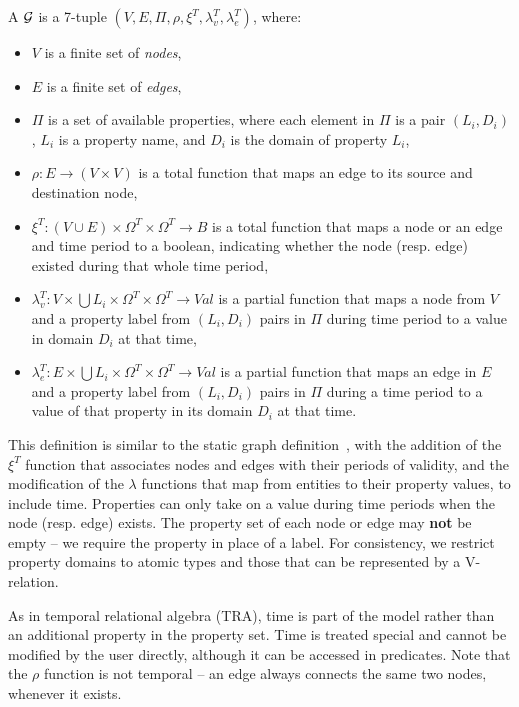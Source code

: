 \begin{definition}[TGraph]
\label{def:tg1}
A \tg $\mathcal{G}$ is a 7-tuple \break $(V,E,\Pi,\rho,\xi^T,\lambda^T_v,\lambda^T_e)$, where:

\begin{itemize}[noitemsep,topsep=3pt,itemindent=\dimexpr{}+\relax,leftmargin=7pt]
\item $V$ is a finite set of {\em nodes},
\item $E$ is a finite set of {\em edges},
\item $\Pi$ is a set of available properties, where each element in $\Pi$ is a pair $(L_i,D_i)$, $L_i$ is a property name, and $D_i$ is the domain of property $L_i$,
\item $\rho: E \to (V \times V)$ is a total function that maps an edge to its source and destination node,
\item $\xi^T: (V \cup E) \times \Omega^T \times \Omega^T \to B$ is a total function that maps a node or an edge and time period to a boolean, indicating whether the node (resp. edge) existed during that whole time period,
\item $\lambda^T_v: V \times \bigcup L_i \times \Omega^T \times \Omega^T \to Val$ is a partial function that maps a node from $V$ and a property label from $(L_i,D_i)$ pairs in $\Pi$ during time period to a value in domain $D_i$ at that time,
\item $\lambda^T_e: E \times \bigcup L_i \times \Omega^T \times \Omega^T \to Val$ is a partial function that maps an edge in $E$ and a property label from $(L_i,D_i)$ pairs in $\Pi$ during a time period to a value of that property in its domain $D_i$ at that time.
\end{itemize}
\end{definition}

This definition is similar to the static graph
definition~\cite{DBLP:journals/corr/AnglesABHRV16}, with the addition
of the $\xi^T$ function that associates nodes and edges with their
periods of validity, and the modification of the $\lambda$ functions
that map from entities to their property values, to include time.
Properties can only take on a value during time periods when the node
(resp. edge) exists.  The property set of each node or edge may {\bf
  not} be empty -- we require the  property in place of a
label.  For consistency, we restrict property domains to atomic types
and those that can be represented by a V-relation.

As in temporal relational algebra (TRA), time is part of the model
rather than an additional property in the property set.  Time is
treated special and cannot be modified by the user directly, although
it can be accessed in predicates.   Note
that the $\rho$ function is not temporal -- an edge always connects
the same two nodes, whenever it exists.

